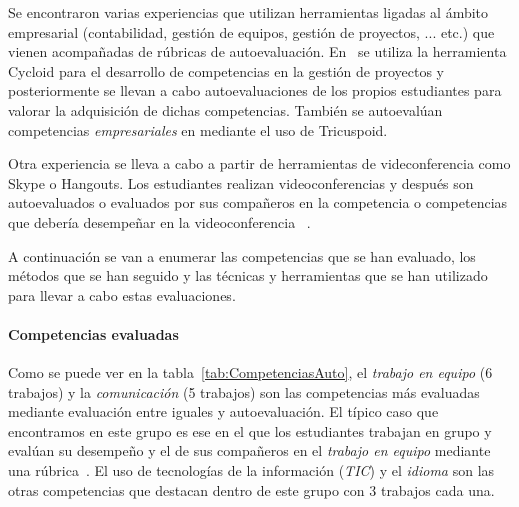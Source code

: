 Se encontraron varias experiencias que utilizan herramientas ligadas al ámbito empresarial (contabilidad, gestión de equipos, gestión de proyectos, ... etc.) que vienen acompañadas de rúbricas de autoevaluación.  En~\cite{chang2009international} se utiliza la herramienta Cycloid para el desarrollo de competencias en la gestión de proyectos y posteriormente se llevan a cabo autoevaluaciones de los propios estudiantes para valorar la adquisición de dichas competencias. También se autoevalúan competencias \emph{empresariales} en  \cite{achcaoucaou2014competence} mediante el uso de Tricuspoid.

Otra experiencia se lleva a cabo a partir de herramientas de videconferencia como Skype o Hangouts. Los estudiantes realizan videoconferencias y después son autoevaluados o evaluados por sus compañeros en la competencia o competencias que debería desempeñar en la videoconferencia~ \cite{masip2013self}.

A continuación se van a enumerar las competencias que se han evaluado, los métodos que se han seguido y las técnicas y herramientas que se han utilizado para llevar a cabo estas evaluaciones.

\paragraph*{Competencias evaluadas}
Como se puede ver en la tabla~\ref{tab:CompetenciasAuto}, el \emph{trabajo en equipo} (6 trabajos) y la \emph{comunicación} (5 trabajos) son las competencias más evaluadas mediante evaluación entre iguales y autoevaluación. El típico caso que encontramos en este grupo es ese en el que los estudiantes trabajan en grupo y evalúan su desempeño y el de sus compañeros en el \emph{trabajo en equipo} mediante una rúbrica~\cite{ficapal2015learning}.
El uso de tecnologías de la información (\emph{TIC}) y el \emph{idioma} son las otras competencias que destacan dentro de este grupo con 3 trabajos cada una. 

